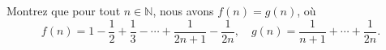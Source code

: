 Montrez que pour tout $n \in \mathbb{N}$, nous avons $f(n) = g(n)$, où
\[
f(n) = 1 - \frac{1}{2} + \frac{1}{3} - \cdots + \frac{1}{2n+1} - \frac{1}{2n},
\quad
g(n) = \frac{1}{n+1} + \cdots + \frac{1}{2n}.
\]
